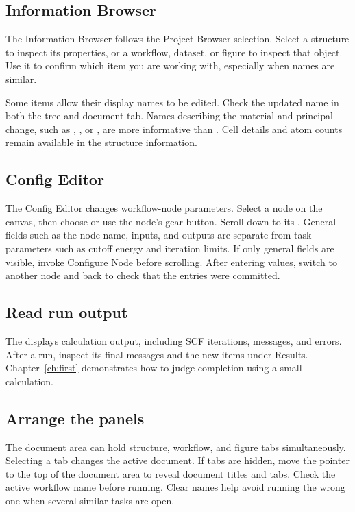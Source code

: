 \subsection{Information Browser}
The Information Browser follows the Project Browser selection. Select a structure to inspect its properties, or a workflow, dataset, or figure to inspect that object. Use it to confirm which item you are working with, especially when names are similar.

Some items allow their display names to be edited. Check the updated name in both the tree and document tab. Names describing the material and principal change, such as , , or , are more informative than . Cell details and atom counts remain available in the structure information.

\subsection{Config Editor}
The Config Editor changes workflow-node parameters. Select a node on the canvas, then choose  or use the node's gear button. Scroll down to its . General fields such as the node name, inputs, and outputs are separate from task parameters such as cutoff energy and iteration limits. If only general fields are visible, invoke Configure Node before scrolling. After entering values, switch to another node and back to check that the entries were committed.

\subsection{Read run output}

The  displays calculation output, including SCF iterations, messages, and errors. After a run, inspect its final messages and the new items under Results. Chapter~\ref{ch:first} demonstrates how to judge completion using a small calculation.

\subsection{Arrange the panels}
The document area can hold structure, workflow, and figure tabs simultaneously. Selecting a tab changes the active document. If tabs are hidden, move the pointer to the top of the document area to reveal document titles and tabs. Check the active workflow name before running. Clear names help avoid running the wrong one when several similar tasks are open.

